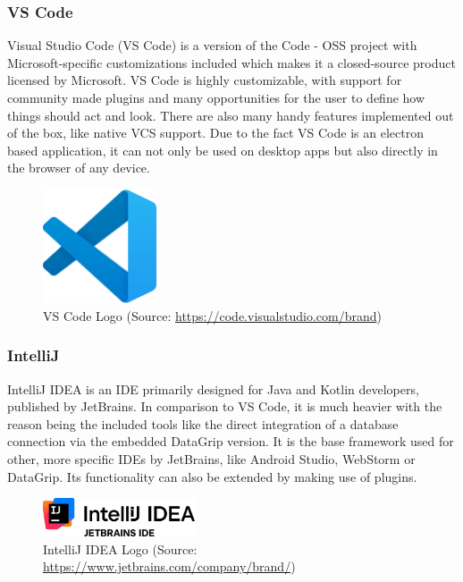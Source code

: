 \Author{\daAuthorTwo}

\subsubsection{VS Code}
Visual Studio Code (VS Code) is a version of the Code - OSS project with Microsoft-specific customizations included which makes it a closed-source product licensed by Microsoft. VS Code is highly customizable, with support for community made plugins and many opportunities for the user to define how things should act and look. \autocite{VSCode:readMe} There are also many handy features implemented out of the box, like native VCS support. Due to the fact VS Code is an electron based application, it can not only be used on desktop apps but also directly in the browser of any device. \autocite{VSCode:electron} \autocite{VSCode:web}

\begin{figure} [H]
    \center
    \includegraphics [width=0.3\textwidth] {images/Technologies/vscodeLogo.png}
    \caption{VS Code Logo (Source: \url{https://code.visualstudio.com/brand})}
\end{figure}

\subsubsection{IntelliJ}
IntelliJ IDEA is an IDE primarily designed for Java and Kotlin developers, published by JetBrains. In comparison to VS Code, it is much heavier with the reason being the included tools like the direct integration of a database connection via the embedded DataGrip version. It is the base framework used for other, more specific IDEs by JetBrains, like Android Studio, WebStorm or DataGrip. Its functionality can also be extended by making use of plugins. 
\autocite{IntelliJ:JetBrains}
\autocite{IntelliJ:Wikipedia}

\begin{figure} [H]
    \center
    \includegraphics [width=0.4\textwidth] {images/Technologies/intellijLogo.png}
    \caption{IntelliJ IDEA Logo (Source: \url{https://www.jetbrains.com/company/brand/})}
\end{figure}

